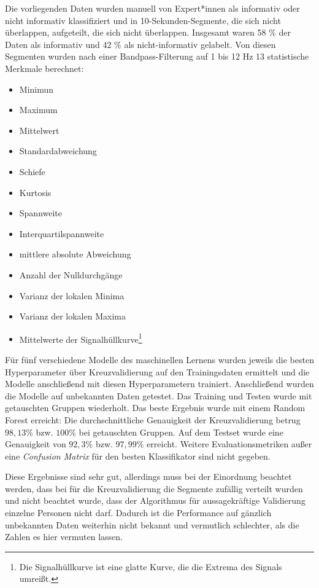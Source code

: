 	Die vorliegenden Daten wurden manuell von Expert*innen als informativ oder nicht informativ klassifiziert und in 10-Sekunden-Segmente, die sich nicht überlappen, aufgeteilt, die sich nicht überlappen. Insgesamt waren 58 \% der Daten als informativ und 42 \% als nicht-informativ gelabelt. Von diesen Segmenten wurden nach einer Bandpass-Filterung auf 1 bis 12 Hz 13 statistische Merkmale berechnet:
	\begin{itemize}
		\item Minimun
		\item Maximum
		\item Mittelwert
		\item Standardabweichung
		\item Schiefe
		\item Kurtosis
		\item Spannweite
		\item Interquartilspannweite
		\item mittlere absolute Abweichung
		\item Anzahl der Nulldurchgänge
		\item Varianz der lokalen Minima
		\item Varianz der lokalen Maxima
		\item Mittelwerte der Signalhüllkurve\footnote{Die Signalhüllkurve ist eine glatte Kurve, die die Extrema des Signals umreißt.}
	\end{itemize}
	
	Für fünf verschiedene Modelle des maschinellen Lernens wurden jeweils die besten Hyperparameter über Kreuzvalidierung auf den Trainingsdaten ermittelt und die Modelle anschließend mit diesen Hyperparametern trainiert. Anschließend wurden die Modelle auf unbekannten Daten getestet. Das Training und Testen wurde mit getauschten Gruppen wiederholt. Das beste Ergebnis wurde mit einem Random Forest erreicht: Die durchschnittliche Genauigkeit der Kreuzvalidierung betrug $98,13 \% $ bzw. $100 \%$ bei getauschten Gruppen. Auf dem Testset wurde eine Genauigkeit von $92,3 \%$ bzw. $97,99 \%$ erreicht. Weitere Evaluationsmetriken außer eine \textit{Confusion Matrix} für den besten Klassifikator sind nicht gegeben.
	
	Diese Ergebnisse sind sehr gut, allerdings muss bei der Einordnung beachtet werden, dass bei für die Kreuzvalidierung die Segmente zufällig verteilt wurden und nicht beachtet wurde, dass der Algorithmus für aussagekräftige Validierung einzelne Personen nicht darf. Dadurch ist die Performance auf gänzlich unbekannten Daten weiterhin nicht bekannt und vermutlich schlechter, als die Zahlen es hier vermuten lassen.
	
